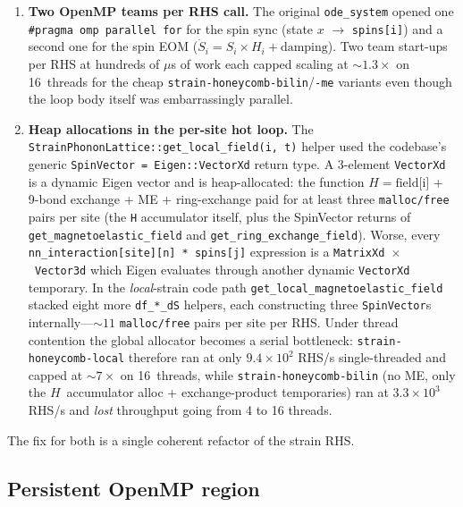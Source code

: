 \documentclass[11pt,letterpaper]{article}
\begin{document}
\begin{enumerate}[noitemsep]
  \item \textbf{Two OpenMP teams per RHS call.}  The original
        \texttt{ode\_system} opened one \texttt{\#pragma omp parallel
        for} for the spin sync (state $x$ $\to$ \texttt{spins[i]}) and
        a second one for the spin EOM
        ($\dot{S}_i = S_i \times H_i + \text{damping}$).  Two
        team start-ups per RHS at hundreds of $\mu$s of work each
        capped scaling at $\sim 1.3\times$ on 16~threads for the
        cheap \texttt{strain-honeycomb-bilin}/\texttt{-me} variants
        even though the loop body itself was embarrassingly parallel.
  \item \textbf{Heap allocations in the per-site hot loop.}  The
        \texttt{StrainPhononLattice::get\_local\_field(i, t)} helper
        used the codebase's generic \texttt{SpinVector
        = Eigen::VectorXd} return type.  A 3-element \texttt{VectorXd}
        is a dynamic Eigen vector and is heap-allocated:
        the function $H = \text{field[i]}$ + 9-bond exchange + ME +
        ring-exchange paid for at least three \texttt{malloc/free}
        pairs per site (the \texttt{H} accumulator itself, plus the
        SpinVector returns of \texttt{get\_magnetoelastic\_field} and
        \texttt{get\_ring\_exchange\_field}).  Worse, every
        \texttt{nn\_interaction[site][n] * spins[j]} expression is a
        \texttt{MatrixXd~$\times$~Vector3d} which Eigen evaluates
        through another dynamic \texttt{VectorXd} temporary.  In the
        \emph{local}-strain code path
        \texttt{get\_local\_magnetoelastic\_field} stacked eight more
        \texttt{df\_*\_dS} helpers, each constructing three
        \texttt{SpinVector}s internally---$\sim 11$
        \texttt{malloc/free} pairs per site per RHS.  Under thread
        contention the global allocator becomes a serial bottleneck:
        \texttt{strain-honeycomb-local} therefore ran at only
        $9.4 \times 10^{2}$ RHS/s single-threaded and capped at
        $\sim 7\times$ on 16~threads, while
        \texttt{strain-honeycomb-bilin} (no ME, only the
        $H$~accumulator alloc + exchange-product temporaries) ran
        at $3.3 \times 10^{3}$ RHS/s and \emph{lost} throughput
        going from 4 to 16 threads.
\end{enumerate}

The fix for both is a single coherent refactor of the strain RHS.

\subsection{Persistent OpenMP region}
\end{document}
